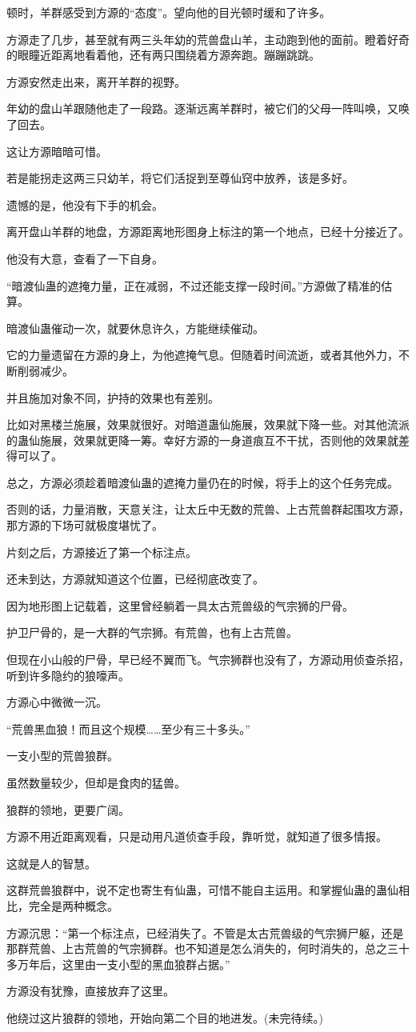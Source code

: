 \begin{this_body}
顿时，羊群感受到方源的“态度”。望向他的目光顿时缓和了许多。

方源走了几步，甚至就有两三头年幼的荒兽盘山羊，主动跑到他的面前。瞪着好奇的眼瞳近距离地看着他，还有两只围绕着方源奔跑。蹦蹦跳跳。

方源安然走出来，离开羊群的视野。

年幼的盘山羊跟随他走了一段路。逐渐远离羊群时，被它们的父母一阵叫唤，又唤了回去。

这让方源暗暗可惜。

若是能拐走这两三只幼羊，将它们活捉到至尊仙窍中放养，该是多好。

遗憾的是，他没有下手的机会。

离开盘山羊群的地盘，方源距离地形图身上标注的第一个地点，已经十分接近了。

他没有大意，查看了一下自身。

“暗渡仙蛊的遮掩力量，正在减弱，不过还能支撑一段时间。”方源做了精准的估算。

暗渡仙蛊催动一次，就要休息许久，方能继续催动。

它的力量遗留在方源的身上，为他遮掩气息。但随着时间流逝，或者其他外力，不断削弱减少。

并且施加对象不同，护持的效果也有差别。

比如对黑楼兰施展，效果就很好。对暗道蛊仙施展，效果就下降一些。对其他流派的蛊仙施展，效果就更降一筹。幸好方源的一身道痕互不干扰，否则他的效果就差得可以了。

总之，方源必须趁着暗渡仙蛊的遮掩力量仍在的时候，将手上的这个任务完成。

否则的话，力量消散，天意关注，让太丘中无数的荒兽、上古荒兽群起围攻方源，那方源的下场可就极度堪忧了。

片刻之后，方源接近了第一个标注点。

还未到达，方源就知道这个位置，已经彻底改变了。

因为地形图上记载着，这里曾经躺着一具太古荒兽级的气宗狮的尸骨。

护卫尸骨的，是一大群的气宗狮。有荒兽，也有上古荒兽。

但现在小山般的尸骨，早已经不翼而飞。气宗狮群也没有了，方源动用侦查杀招，听到许多隐约的狼嚎声。

方源心中微微一沉。

“荒兽黑血狼！而且这个规模……至少有三十多头。”

一支小型的荒兽狼群。

虽然数量较少，但却是食肉的猛兽。

狼群的领地，更要广阔。

方源不用近距离观看，只是动用凡道侦查手段，靠听觉，就知道了很多情报。

这就是人的智慧。

这群荒兽狼群中，说不定也寄生有仙蛊，可惜不能自主运用。和掌握仙蛊的蛊仙相比，完全是两种概念。

方源沉思：“第一个标注点，已经消失了。不管是太古荒兽级的气宗狮尸躯，还是那群荒兽、上古荒兽的气宗狮群。也不知道是怎么消失的，何时消失的，总之三十多万年后，这里由一支小型的黑血狼群占据。”

方源没有犹豫，直接放弃了这里。

他绕过这片狼群的领地，开始向第二个目的地进发。(未完待续。)

\end{this_body}

